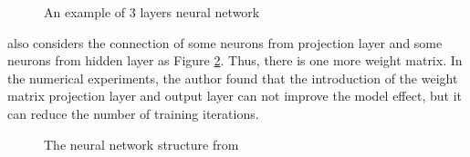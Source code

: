 \begin{figure}[!ht]
  \centering
	\caption{An example of 3 layers neural network}
	\label{fig:neural3}
\end{figure}

\citep{bengio2003neural} also considers the connection of some neurons from projection layer and some neurons from hidden layer as Figure \ref{fig:bengio}. Thus, there is one more weight matrix. In the numerical experiments, the author found that the introduction of the weight matrix projection layer and output layer can not improve the model effect, but it can reduce the number of training iterations.\\

\begin{figure}[!ht]
  \centering
	\caption{The neural network structure from \citep{bengio2003neural}}
	\label{fig:bengio}
\end{figure}

